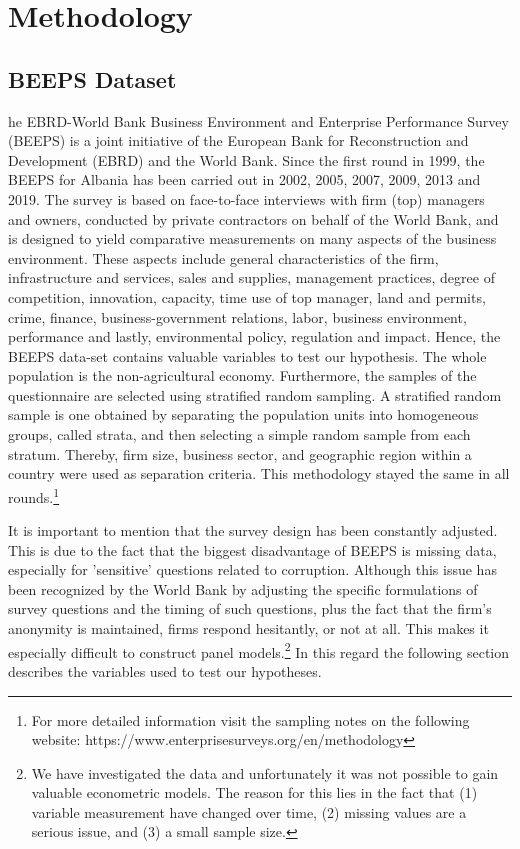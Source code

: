 %
%
\let\textcircled=\pgftextcircled
\chapter{Methodology}
\label{chap:example}


\section{BEEPS Dataset}
he EBRD-World Bank Business Environment and Enterprise Performance Survey (BEEPS) is a joint initiative of the European Bank for Reconstruction and Development (EBRD) and the World Bank. Since the first round in 1999, the BEEPS for Albania has been carried out in 2002, 2005, 2007, 2009, 2013 and 2019. The survey is based on face-to-face interviews with firm (top) managers and owners, conducted by private contractors on behalf of the World Bank, and is designed to yield comparative measurements on many aspects of the business environment. These aspects include general characteristics of the firm, infrastructure and services, sales and supplies, management practices, degree of competition, innovation, capacity, time use of top manager, land and permits, crime, finance, business-government relations, labor, business environment, performance and lastly, environmental policy, regulation and impact. Hence, the BEEPS data-set contains valuable variables to test our hypothesis. The whole population is the non-agricultural economy. Furthermore, the samples of the questionnaire are selected using stratified random sampling. A stratified random sample is one obtained by separating the population units into homogeneous groups, called strata, and then selecting a simple random sample from each stratum. \citep[p. 353]{wooldridge} Thereby, firm size, business sector, and geographic region within a country were used as separation criteria. This methodology stayed the same in all rounds.\footnote{For more detailed information visit the sampling notes on the following website: https://www.enterprisesurveys.org/en/methodology}

It is important to mention that the survey design has been constantly adjusted. This is due to the fact that the biggest disadvantage of BEEPS is missing data, especially for 'sensitive' questions related to corruption. Although this issue has been recognized by the World Bank by adjusting the specific formulations of survey questions and the timing of such questions, plus the fact that the firm's anonymity is maintained, firms respond hesitantly, or not at all. This makes it especially difficult to construct panel models.\footnote{We have investigated the data and unfortunately it was not possible to gain valuable econometric models. The reason for this lies in the fact that (1) variable measurement have changed over time, (2) missing values are a serious issue, and (3) a small sample size.} 
In this regard the following section describes the variables used to test our hypotheses.

